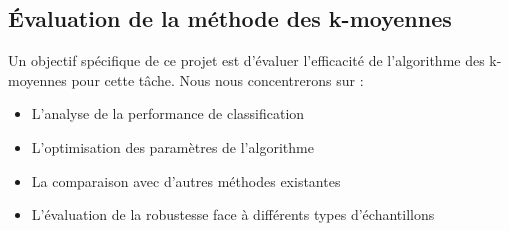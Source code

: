 \subsection{Évaluation de la méthode des k-moyennes}
Un objectif spécifique de ce projet est d'évaluer l'efficacité de l'algorithme des k-moyennes pour cette tâche. Nous nous concentrerons sur :
\begin{itemize}
    \item L'analyse de la performance de classification
    \item L'optimisation des paramètres de l'algorithme
    \item La comparaison avec d'autres méthodes existantes
    \item L'évaluation de la robustesse face à différents types d'échantillons
\end{itemize}